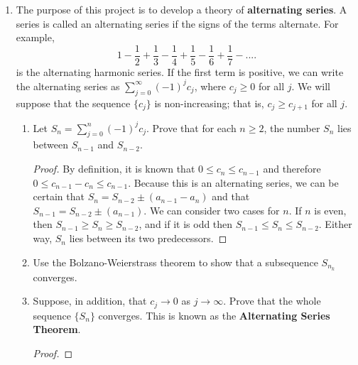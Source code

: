 \documentclass{article}
\begin{document}
\begin{enumerate}
      \item The purpose of this project is to develop a theory of
            \textbf{alternating series}. A series is called an alternating
            series if the signs of the terms alternate. For example,
            \[
                  1-\frac{1}{2}+\frac{1}{3}-\frac{1}{4}+\frac{1}{5}
                  -\frac{1}{6}+\frac{1}{7}-....
            \]
            is the alternating harmonic series. If the first term is positive,
            we can write the alternating series as $\sum_{j=0}^\infty(-1)^jc_j$,
            where $c_j\geq 0$ for all $j$. We will suppose that the sequence
            $\{c_j\}$ is non-increasing; that is, $c_j\geq c_{j+1}$ for all $j$.
            \begin{enumerate}
                  \item Let $S_n=\sum_{j=0}^n(-1)^jc_j$. Prove that for each $n\geq 2$,
                        the number $S_n$ lies between $S_{n-1}$ and $S_{n-2}$.
                        \begin{proof}
                              By definition, it is known that $0\leq c_n\leq c_{n-1}$
                              and therefore $0\leq c_{n-1}-c_n\leq c_{n-1}$.
                              Because this is an alternating series, we can be
                              certain that $S_n=S_{n-2}\pm (a_{n-1}-a_n)$ and
                              that $S_{n-1}=S_{n-2}\pm (a_{n-1})$. We can consider two
                              cases for $n$. If $n$ is even,
                              then $S_{n-1}\geq S_n\geq S_{n-2}$, and if it is odd
                              then $S_{n-1}\leq S_n\leq S_{n-2}$. Either way, $S_n$
                              lies between its two predecessors.
                        \end{proof}
                  \item  Use the Bolzano-Weierstrass theorem to show that a subsequence
                        $S_{n_k}$ converges.
                  \item Suppose, in addition, that $c_j\to 0$ as $j\to\infty$. Prove that
                        the whole sequence $\{S_n\}$ converges. This is known as the
                        \textbf{Alternating Series Theorem}.
                        \begin{proof}


\end{proof}
\end{enumerate}
\end{enumerate}
\end{document}
